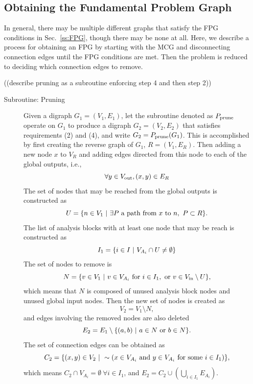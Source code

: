 \subsection{Obtaining the Fundamental Problem Graph}
	\label{ss:obtaining FPG}
	In general, there may be multiple different graphs that satisfy the FPG conditions in Sec.~\ref{ss:FPG}, though there may be none at all. 
	Here, we describe a process for obtaining an FPG by starting with the MCG and disconnecting connection edges until the FPG conditions are met. 
	Then the problem is reduced to deciding which connection edges to remove.

((describe pruning as a subroutine enforcing step 4 and then step 2))

	\begin{description}
	\item[Subroutine: Pruning] 
		Given a digraph $G_1 = (V_1,E_1)$, let the subroutine denoted as $P_\textrm{prune}$ operate on $G_1$ to produce a digraph $G_2 = (V_2,E_2)$ that satisfies requirements (2) 
		and (4), and write $G_2 = P_\textrm{prune} ( G_1 )$. 
		This is accomplished by first creating the reverse graph of $G_1$, $R = (V_1,E_R)$. Then adding a new node $x$ to $V_R$ and adding edges directed from this node to each of the global outputs, i.e.,
	\begin{equation}
		\forall y \in V_\textrm{out}, (x,y) \in E_R
	\end{equation}
		The set of nodes that may be reached from the global outputs is constructed as
	\begin{equation}
		U = \{ n \in V_1 \ | \  \exists P \textrm{ a path from $x$ to $n$}, \ P \subset R \}.
		\end{equation}
		The list of analysis blocks with at least one node that may be reach is constructed as
		\begin{equation}
		I_1 = \{ i \in I \ | \  V_{A_i} \cap U \neq \emptyset \}
		\end{equation}
		The set of nodes to remove is
		\begin{equation}
		N = \{ v \in V_1 \ | \  v \in V_{A_i} \textrm{ for } i \in I_1, \textrm{ or } v \in V_\textrm{in}\setminus U \},
		\end{equation}
		which means that $N$ is composed of unused analysis block nodes and unused global input nodes. Then the new set of nodes is created as
		\begin{equation}
		V_2 = V_1 \setminus N,
		\end{equation}
		and edges involving the removed nodes are also deleted
		\begin{equation}
		E_2 = E_1 \setminus \{ (a,b) \ | \  a \in N \textrm{ or } b \in N  \}.
		\end{equation}
		The set of connection edges can be obtained as
		\begin{equation}
		C_2 = \{(x,y) \in V_{2} \ | \  \sim(x \in V_{A_i} \textrm{ and } y \in V_{A_i} \textrm{ for some } i \in I_1)\},
		\end{equation}
		which means $C_2 \cap V_{A_i} = \emptyset  \ \forall i \in I_1$, and $E_2 = C_2 \cup \left( \bigcup_{i \in I_1} E_{A_i} \right)$. 


\end{description}
